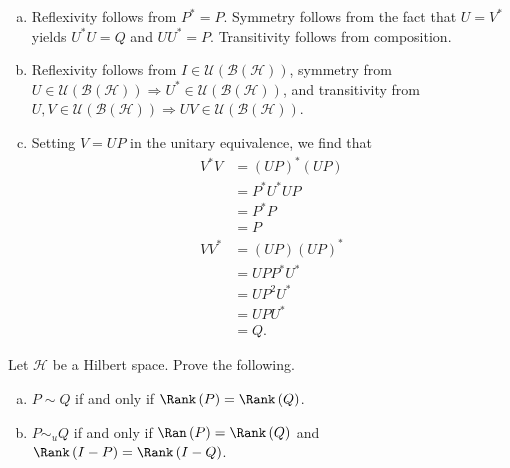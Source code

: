 \documentclass[10pt]{mypackage}
\begin{document}
\begin{solution}
  \begin{enumerate}[(a)]
    \item Reflexivity follows from $P^{\ast} = P$. Symmetry follows from the fact that $U = V^{\ast}$ yields $U^{\ast}U = Q$ and $UU^{\ast} = P$. Transitivity follows from composition.
    \item Reflexivity follows from $I\in \mathcal{U}\left(\mathcal{B}\left(\mathcal{H}\right)\right)$, symmetry from $U \in \mathcal{U}\left(\mathcal{B}\left(\mathcal{H}\right)\right)\Rightarrow U^{\ast}\in \mathcal{U}\left(\mathcal{B}\left(\mathcal{H}\right)\right)$, and transitivity from $U,V\in \mathcal{U}\left(\mathcal{B}\left(\mathcal{H}\right)\right) \Rightarrow UV\in \mathcal{U}\left(\mathcal{B}\left(\mathcal{H}\right)\right)$.
    \item Setting $V = UP$ in the unitary equivalence, we find that
      \begin{align*}
        V^{\ast}V &= \left(UP\right)^{\ast}\left(UP\right)\\
                  &= P^{\ast}U^{\ast}UP\\
                  &= P^{\ast}P\\
                  &= P\\
        VV^{\ast} &= \left(UP\right)\left(UP\right)^{\ast}\\
                  &= UPP^{\ast}U^{\ast}\\
                  &= UP^2U^{\ast}\\
                  &= UPU^{\ast}\\
                  &= Q.
      \end{align*}
  \end{enumerate}
\end{solution}
\begin{exercise}
  Let $\mathcal{H}$ be a Hilbert space. Prove the following.
  \begin{enumerate}[(a)]
    \item $P\sim Q$ if and only if $\Rank\left(P\right) = \Rank\left(Q\right)$.
    \item $P\sim_{u} Q$ if and only if $\Ran\left(P\right) = \Rank\left(Q\right)$ and $\Rank\left(I-P\right) = \Rank\left(I-Q\right)$.
  \end{enumerate}
\end{exercise}
\end{document}
